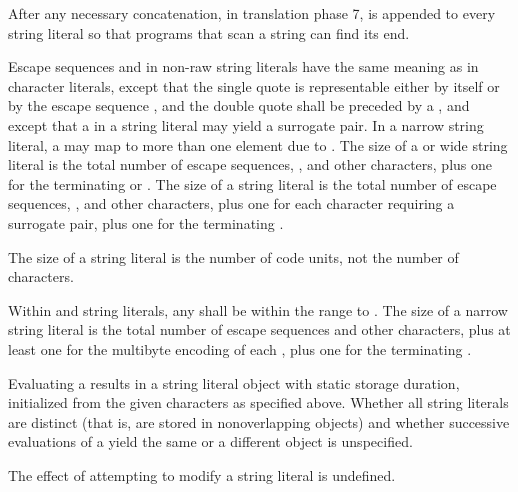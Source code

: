 \pnum
{}%
%
%
After any necessary concatenation, in translation phase
7,  is appended to every
string literal so that programs that scan a string can find its end.

\pnum
Escape sequences and  in non-raw string literals
have the same meaning as in character literals, except that
the single quote  is representable either by itself or by the escape sequence
, and the double quote  shall be preceded by a
\tcode{\textbackslash},
and except that a  in a
 string literal may yield a surrogate pair.
%
In a narrow string literal, a  may map to more
than one  element due to . The
size of a  or wide string literal is the total number of
escape sequences, , and other characters, plus
one for the terminating  or
. The size of a  string
literal is the total number of escape sequences,
, and other characters, plus one for each
character requiring a surrogate pair, plus one for the terminating
. \begin{note} The size of a 
string literal is the number of code units, not the number of
characters. \end{note} Within  and 
string literals, any  shall be within the range
 to . The size of a narrow string literal is
the total number of escape sequences and other characters, plus at least
one for the multibyte encoding of each , plus
one for the terminating .

\pnum
Evaluating a  results in a string literal object
with static storage duration, initialized from the given characters as
specified above.
%
Whether all string literals are distinct (that is, are stored in
nonoverlapping objects) and whether successive evaluations of a
 yield the same or a different object is
unspecified.
\begin{note}
%
The effect of attempting to modify a string literal is undefined. \end{note}

